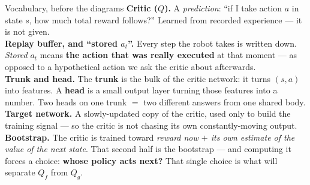 \documentclass[aspectratio=169]{beamer}
\begin{document}
\begin{frame}{Vocabulary, before the diagrams}
  \relax
  {\footnotesize
  \textbf{Critic ($Q$).} A \emph{prediction}: ``if I take action $a$ in state $s$, how much total
  reward follows?'' Learned from recorded experience --- it is not given.\\[4pt]
  \textbf{Replay buffer, and ``stored $a_t$''.} Every step the robot takes is written down.
  \emph{Stored} $a_t$ means \textbf{the action that was really executed} at that moment --- as
  opposed to a hypothetical action we ask the critic about afterwards.\\[4pt]
  \textbf{Trunk and head.} The \textbf{trunk} is the bulk of the critic network: it turns
  $(s,a)$ into features. A \textbf{head} is a small output layer turning those features into a
  number. Two heads on one trunk $=$ two different answers from one shared body.\\[4pt]
  \textbf{Target network.} A slowly-updated copy of the critic, used only to build the training
  signal --- so the critic is not chasing its own constantly-moving output.\\[4pt]
  \textbf{Bootstrap.} The critic is trained toward \emph{reward now $+$ its own estimate of the
  value of the next state}. That second half is the bootstrap --- and computing it forces a
  choice: \textbf{whose policy acts next?} That single choice is what will separate $Q_f$ from
  $Q_g$.}
\end{frame}
\end{document}
